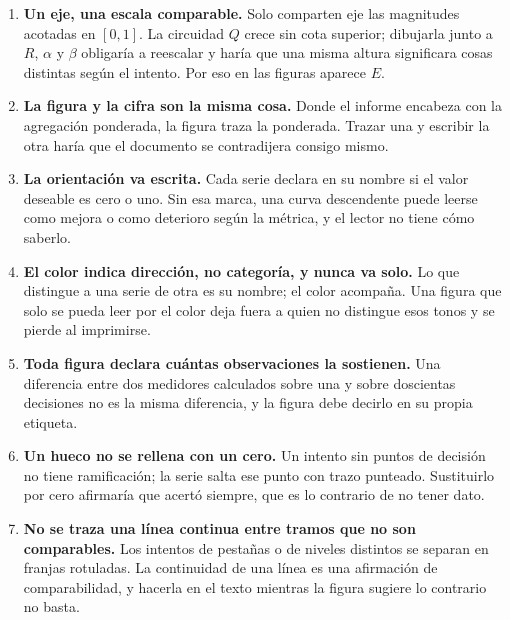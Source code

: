 \documentclass{book}
\begin{document}
\begin{enumerate}
    \item \textbf{Un eje, una escala comparable.} Solo comparten eje las
    magnitudes acotadas en $[0,1]$. La circuidad $Q$ crece sin cota
    superior; dibujarla junto a $R$, $\alpha$ y $\beta$ obligaría a
    reescalar y haría que una misma altura significara cosas distintas
    según el intento. Por eso en las figuras aparece $E$.

    \item \textbf{La figura y la cifra son la misma cosa.} Donde el
    informe encabeza con la agregación ponderada, la figura traza la
    ponderada. Trazar una y escribir la otra haría que el documento se
    contradijera consigo mismo.

    \item \textbf{La orientación va escrita.} Cada serie declara en su
    nombre si el valor deseable es cero o uno. Sin esa marca, una curva
    descendente puede leerse como mejora o como deterioro según la
    métrica, y el lector no tiene cómo saberlo.

    \item \textbf{El color indica dirección, no categoría, y nunca va
    solo.} Lo que distingue a una serie de otra es su nombre; el color
    acompaña. Una figura que solo se pueda leer por el color deja fuera
    a quien no distingue esos tonos y se pierde al imprimirse.

    \item \textbf{Toda figura declara cuántas observaciones la
    sostienen.} Una diferencia entre dos medidores calculados sobre una
    y sobre doscientas decisiones no es la misma diferencia, y la figura
    debe decirlo en su propia etiqueta.

    \item \textbf{Un hueco no se rellena con un cero.} Un intento sin
    puntos de decisión no tiene ramificación; la serie salta ese punto
    con trazo punteado. Sustituirlo por cero afirmaría que acertó
    siempre, que es lo contrario de no tener dato.

    \item \textbf{No se traza una línea continua entre tramos que no son
    comparables.} Los intentos de pestañas o de niveles distintos se
    separan en franjas rotuladas. La continuidad de una línea es una
    afirmación de comparabilidad, y hacerla en el texto mientras la
    figura sugiere lo contrario no basta.
\end{enumerate}
\end{document}
